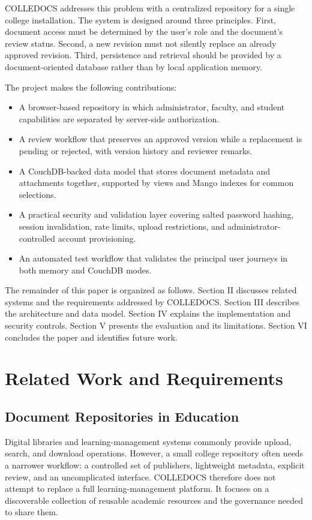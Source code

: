 \documentclass[conference]{IEEEtran}
\begin{document}
COLLEDOCS addresses this problem with a centralized repository for a single college installation. The system is designed around three principles. First, document access must be determined by the user's role and the document's review status. Second, a new revision must not silently replace an already approved revision. Third, persistence and retrieval should be provided by a document-oriented database rather than by local application memory.

The project makes the following contributions:
\begin{itemize}
    \item A browser-based repository in which administrator, faculty, and student capabilities are separated by server-side authorization.
    \item A review workflow that preserves an approved version while a replacement is pending or rejected, with version history and reviewer remarks.
    \item A CouchDB-backed data model that stores document metadata and attachments together, supported by views and Mango indexes for common selections.
    \item A practical security and validation layer covering salted password hashing, session invalidation, rate limits, upload restrictions, and administrator-controlled account provisioning.
    \item An automated test workflow that validates the principal user journeys in both memory and CouchDB modes.
\end{itemize}

The remainder of this paper is organized as follows. Section II discusses related systems and the requirements addressed by COLLEDOCS. Section III describes the architecture and data model. Section IV explains the implementation and security controls. Section V presents the evaluation and its limitations. Section VI concludes the paper and identifies future work.

\section{Related Work and Requirements}

\subsection{Document Repositories in Education}
Digital libraries and learning-management systems commonly provide upload, search, and download operations. However, a small college repository often needs a narrower workflow: a controlled set of publishers, lightweight metadata, explicit review, and an uncomplicated interface. COLLEDOCS therefore does not attempt to replace a full learning-management platform. It focuses on a discoverable collection of reusable academic resources and the governance needed to share them.
\end{document}
